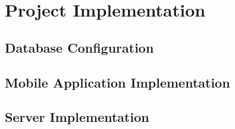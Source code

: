 \chapter{Project Implementation}
\section{Database Configuration}
\section{Mobile Application Implementation}
\section{Server Implementation}
